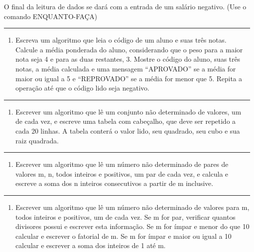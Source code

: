 \documentclass[12pt,a4paper]{article}
\providecommand{\tightlist}{%
      \setlength{\itemsep}{0pt}\setlength{\parskip}{0pt}}
\begin{document}
O final da leitura de dados se dará com a entrada de um salário
negativo. (Use o comando ENQUANTO-FAÇA)

    \begin{center}\rule{0.5\linewidth}{0.5pt}\end{center}

\begin{enumerate}
\def\labelenumi{\arabic{enumi}.}
\setcounter{enumi}{5}
\tightlist
\item
  Escreva um algoritmo que leia o código de um aluno e suas três notas.
  Calcule a média ponderada do aluno, considerando que o peso para a
  maior nota seja 4 e para as duas restantes, 3. Mostre o código do
  aluno, suas três notas, a média calculada e uma mensagem ``APROVADO''
  se a média for maior ou igual a 5 e ``REPROVADO'' se a média for menor
  que 5. Repita a operação até que o código lido seja negativo.
\end{enumerate}

    \begin{center}\rule{0.5\linewidth}{0.5pt}\end{center}

\begin{enumerate}
\def\labelenumi{\arabic{enumi}.}
\setcounter{enumi}{6}
\tightlist
\item
  Escrever um algoritmo que lê um conjunto não determinado de valores,
  um de cada vez, e escreve uma tabela com cabeçalho, que deve ser
  repetido a cada 20 linhas. A tabela conterá o valor lido, seu
  quadrado, seu cubo e sua raiz quadrada.
\end{enumerate}

    \begin{center}\rule{0.5\linewidth}{0.5pt}\end{center}

\begin{enumerate}
\def\labelenumi{\arabic{enumi}.}
\setcounter{enumi}{7}
\tightlist
\item
  Escrever um algoritmo que lê um número não determinado de pares de
  valores m, n, todos inteiros e positivos, um par de cada vez, e
  calcula e escreve a soma dos n inteiros consecutivos a partir de m
  inclusive.
\end{enumerate}

    \begin{center}\rule{0.5\linewidth}{0.5pt}\end{center}

\begin{enumerate}
\def\labelenumi{\arabic{enumi}.}
\setcounter{enumi}{8}
\tightlist
\item
  Escrever um algoritmo que lê um número não determinado de valores para
  m, todos inteiros e positivos, um de cada vez. Se m for par, verificar
  quantos divisores possui e escrever esta informação. Se m for ímpar e
  menor do que 10 calcular e escrever o fatorial de m. Se m for ímpar e
  maior ou igual a 10 calcular e escrever a soma dos inteiros de 1 até
  m.
\end{enumerate}
\end{document}
